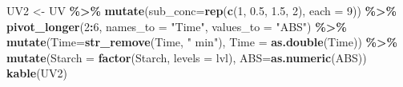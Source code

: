 \documentclass[
  12pt,
]{article}
\newenvironment{Shaded}{\begin{snugshade}}{\end{snugshade}}
\newcommand{\AttributeTok}[1]{\textcolor[rgb]{0.13,0.29,0.53}{#1}}
\newcommand{\DecValTok}[1]{\textcolor[rgb]{0.00,0.00,0.81}{#1}}
\newcommand{\FloatTok}[1]{\textcolor[rgb]{0.00,0.00,0.81}{#1}}
\newcommand{\FunctionTok}[1]{\textcolor[rgb]{0.13,0.29,0.53}{\textbf{#1}}}
\newcommand{\NormalTok}[1]{#1}
\newcommand{\OtherTok}[1]{\textcolor[rgb]{0.56,0.35,0.01}{#1}}
\newcommand{\SpecialCharTok}[1]{\textcolor[rgb]{0.81,0.36,0.00}{\textbf{#1}}}
\newcommand{\StringTok}[1]{\textcolor[rgb]{0.31,0.60,0.02}{#1}}
\begin{document}
\begin{Shaded}
\begin{Highlighting}[]
\NormalTok{UV2 }\OtherTok{\textless{}{-}}\NormalTok{ UV }\SpecialCharTok{\%\textgreater{}\%} 
  \FunctionTok{mutate}\NormalTok{(}\AttributeTok{sub\_conc=}\FunctionTok{rep}\NormalTok{(}\FunctionTok{c}\NormalTok{(}\DecValTok{1}\NormalTok{, }\FloatTok{0.5}\NormalTok{, }\FloatTok{1.5}\NormalTok{, }\DecValTok{2}\NormalTok{), }\AttributeTok{each =} \DecValTok{9}\NormalTok{)) }\SpecialCharTok{\%\textgreater{}\%} 
  \FunctionTok{pivot\_longer}\NormalTok{(}\DecValTok{2}\SpecialCharTok{:}\DecValTok{6}\NormalTok{,}
                    \AttributeTok{names\_to =} \StringTok{"Time"}\NormalTok{,}
                    \AttributeTok{values\_to =} \StringTok{"ABS"}\NormalTok{) }\SpecialCharTok{\%\textgreater{}\%} 
  \FunctionTok{mutate}\NormalTok{(}\AttributeTok{Time=}\FunctionTok{str\_remove}\NormalTok{(Time, }\StringTok{" min"}\NormalTok{),}
         \AttributeTok{Time =} \FunctionTok{as.double}\NormalTok{(Time)) }\SpecialCharTok{\%\textgreater{}\%} 
  \FunctionTok{mutate}\NormalTok{(}\AttributeTok{Starch =} \FunctionTok{factor}\NormalTok{(Starch,}
                         \AttributeTok{levels =}\NormalTok{ lvl),}
         \AttributeTok{ABS=}\FunctionTok{as.numeric}\NormalTok{(ABS)) }
\FunctionTok{kable}\NormalTok{(UV2)}
\end{Highlighting}
\end{Shaded}
\end{document}
